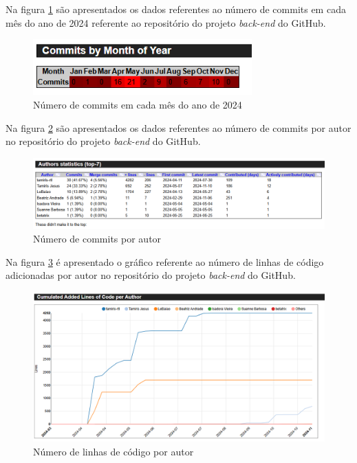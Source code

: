 Na figura \ref{fig:commitsBack} são apresentados os dados referentes ao número de commits em cada mês do ano de 2024 referente ao repositório do projeto \textit{back-end} do GitHub.

\begin{figure}[ht]
        \centering
\includegraphics[width=0.75\textwidth]{images/commits-mes-stats-back.png}
        \caption{Número de commits em cada mês do ano de 2024}
        \label{fig:commitsBack}
    \end{figure}
    

Na figura \ref{fig:commitsAutorBack} são apresentados os dados referentes ao número de commits por autor no repositório do projeto \textit{back-end} do GitHub.  

\begin{figure}[ht]
        \centering
\includegraphics[width=1.0\textwidth]{images/autores-stats-back.png}
        \caption{Número de commits por autor}
        \label{fig:commitsAutorBack}
    \end{figure}

\newpage

Na figura \ref{fig:numeroLinhasBack} é apresentado o gráfico referente ao número de linhas de código adicionadas por autor no repositório do projeto \textit{back-end} do GitHub.  

\begin{figure}[ht]
        \centering
\includegraphics[width=1.0\textwidth]{images/linhas-por-autor-stats-back.png}
        \caption{Número de linhas de código por autor}
        \label{fig:numeroLinhasBack}
    \end{figure}



